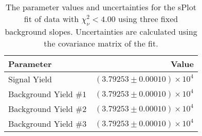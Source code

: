 
\begin{table}[h]
    \begin{center}
        \begin{tabular}{lr}\toprule
            Parameter & Value \\\midrule
            Signal Yield & $(3.79253 \pm 0.00010) \times 10^{4}$ \\
            Background Yield $\#1$ & $(3.79253 \pm 0.00010) \times 10^{4}$ \\
            Background Yield $\#2$ & $(3.79253 \pm 0.00010) \times 10^{4}$ \\
            Background Yield $\#3$ & $(3.79253 \pm 0.00010) \times 10^{4}$ \\\bottomrule
        \end{tabular}
        \caption{The parameter values and uncertainties for the sPlot fit of data with $\chi^2_\nu < 4.00$ using three fixed background slopes. Uncertainties are calculated using the covariance matrix of the fit.}
    \end{center}
\end{table}
